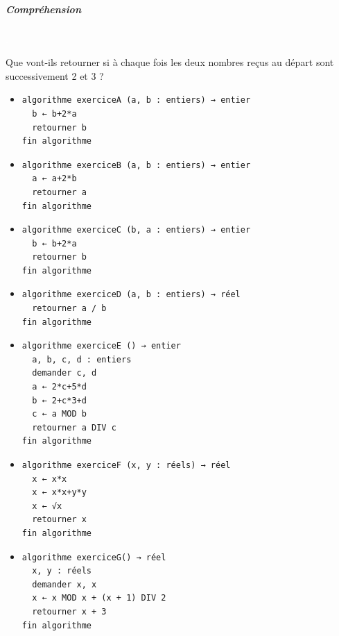 \documentclass[11pt,a4paper]{article}
\begin{document}
			
		\subparagraph{Compr\'ehension} 
		
                \textcolor{white}{.} \par
            
							  Que vont-ils retourner si \`a chaque fois les deux nombres re\c cus au d\'epart sont successivement 2 et 3 ?
							
					\begin{itemize}
				
			\item \begin{verbatim}
algorithme exerciceA (a, b : entiers) → entier
  b ← b+2*a
  retourner b
fin algorithme
				\end{verbatim} \textcolor{gray}{\underline{\hspace*{1em}}} 
			\item \begin{verbatim}
algorithme exerciceB (a, b : entiers) → entier
  a ← a+2*b
  retourner a
fin algorithme
				\end{verbatim} \textcolor{gray}{\underline{\hspace*{1em}}} 
			\item \begin{verbatim}
algorithme exerciceC (b, a : entiers) → entier
  b ← b+2*a
  retourner b
fin algorithme
				\end{verbatim} \textcolor{gray}{\underline{\hspace*{1em}}} 
			\item \begin{verbatim}
algorithme exerciceD (a, b : entiers) → réel
  retourner a / b
fin algorithme
				\end{verbatim} \textcolor{gray}{\underline{\hspace*{2em}}} 
			\item \begin{verbatim}
algorithme exerciceE () → entier
  a, b, c, d : entiers
  demander c, d
  a ← 2*c+5*d
  b ← 2+c*3+d
  c ← a MOD b
  retourner a DIV c
fin algorithme
				\end{verbatim} \textcolor{gray}{\underline{\hspace*{1em}}} 
			\item \begin{verbatim}
algorithme exerciceF (x, y : réels) → réel
  x ← x*x 
  x ← x*x+y*y 
  x ← √x
  retourner x
fin algorithme
				\end{verbatim} \textcolor{gray}{\underline{\hspace*{2em}}} 
			\item \begin{verbatim}
algorithme exerciceG() → réel
  x, y : réels
  demander x, x
  x ← x MOD x + (x + 1) DIV 2
  retourner x + 3
fin algorithme
				\end{verbatim} \textcolor{gray}{\underline{\hspace*{1em}}} 
					\end{itemize}
				
\end{document}
